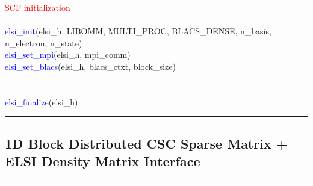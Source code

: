 \documentclass{report}
\begin{document}
\begin{algorithm}[H]
\textcolor{red}{SCF initialization}\\
\hspace{0.3cm}\\
\textcolor{blue}{elsi\_init}(elsi\_h, LIBOMM, MULTI\_PROC, BLACS\_DENSE, n\_basis, n\_electron, n\_state)\\
\textcolor{blue}{elsi\_set\_mpi}(elsi\_h, mpi\_comm)\\
\textcolor{blue}{elsi\_set\_blacs}(elsi\_h, blacs\_ctxt, block\_size)\\
\hspace{0.3cm}\\
\hspace{0.3cm}\\
\textcolor{blue}{elsi\_finalize}(elsi\_h)\\
\end{algorithm}

\noindent\rule{18cm}{0.4pt}

\subsection{1D Block Distributed CSC Sparse Matrix + ELSI Density Matrix Interface}
\label{subsec:example_dm_csc}
\noindent\rule{18cm}{0.4pt}
\end{document}

